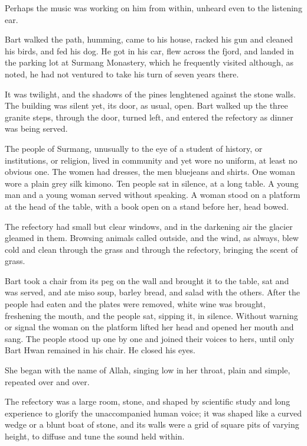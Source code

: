 \documentclass[english,11pt,letterpaper,onecolumn]{scrbook}
\begin{document}
	Perhaps the music was working on him from within, unheard even to the listening ear.

	Bart walked the path, humming, came to his house, racked his gun and cleaned his birds, and fed his dog. He got in his car, flew across the fjord, and landed in the parking lot at Surmang Monastery, which he frequently visited although, as noted, he had not ventured to take his turn of seven years there. 

	It was twilight, and the shadows of the pines lenghtened against the stone walls. The building was silent yet, its door, as usual, open. Bart walked up the three granite steps, through the door, turned left, and entered the refectory as dinner was being served.

	The people of Surmang, unusually to the eye of a student of history, or institutions, or religion, lived in community and yet wore no uniform, at least no obvious one. The women had dresses, the men bluejeans and shirts.  One woman wore a plain grey silk kimono. Ten people sat in silence, at a long table. A young man and a young woman served without speaking. A woman stood on a platform at the head of the table, with a book open on a stand before her, head bowed. 

	The refectory had small but clear windows, and in the darkening air the glacier gleamed in them. Browsing animals called outside, and the wind, as always, blew cold and clean through the grass and through the refectory, bringing the scent of grass. 

	Bart took a chair from its peg on the wall and brought it to the table, sat and was served, and ate miso soup, barley bread, and salad with the others. After the people had eaten and the plates were removed, white wine was brought, freshening the mouth, and the people sat, sipping it, in silence. Without warning or signal the woman on the platform lifted her head and opened her mouth and sang. The people stood up one by one and joined their voices to hers, until only Bart Hwan remained in his chair. He closed his eyes.

	She began with the name of Allah, singing low in her throat, plain and simple, repeated over and over. 

	The refectory was a large room, stone, and shaped by scientific study and long experience to glorify the unaccompanied human voice; it was shaped like a curved wedge or a blunt boat of stone, and its walls were a grid of square pits of varying height, to diffuse and tune the sound held within. 
\end{document}
